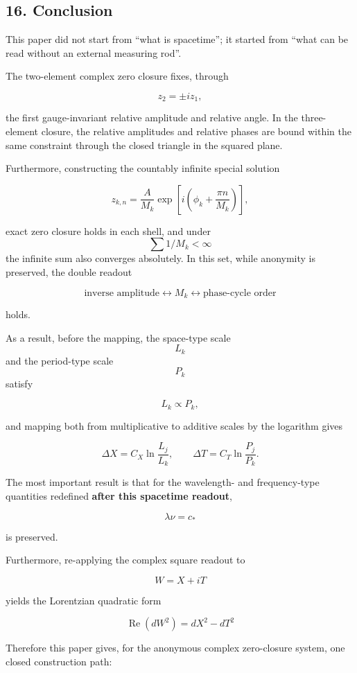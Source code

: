 \documentclass[
  a4paper,
]{article}
\begin{document}
\subsection{16. Conclusion}\label{conclusion}

This paper did not start from ``what is spacetime''; it started from
``what can be read without an external measuring rod''.

The two-element complex zero closure fixes, through

\[
z_2=\pm iz_1,
\]

the first gauge-invariant relative amplitude and relative angle. In the
three-element closure, the relative amplitudes and relative phases are
bound within the same constraint through the closed triangle in the
squared plane.

Furthermore, constructing the countably infinite special solution

\[
z_{k,n}
=
\frac{A}{M_k}
\exp\left[i\left(\phi_k+\frac{\pi n}{M_k}\right)\right],
\]

exact zero closure holds in each shell, and under \[\sum1/M_k<\infty\]
the infinite sum also converges absolutely. In this set, while anonymity
is preserved, the double readout

\[
\text{inverse amplitude}
\longleftrightarrow M_k
\longleftrightarrow
\text{phase-cycle order}
\]

holds.

As a result, before the mapping, the space-type scale \[L_k\] and the
period-type scale \[P_k\] satisfy

\[
L_k\propto P_k,
\]

and mapping both from multiplicative to additive scales by the logarithm
gives

\[
\Delta X
=C_X\ln\frac{L_j}{L_k},
\qquad
\Delta T
=C_T\ln\frac{P_j}{P_k}.
\]

The most important result is that for the wavelength- and frequency-type
quantities redefined \textbf{after this spacetime readout},

\[
\boxed{
\lambda\nu=c_*
}
\]

is preserved.

Furthermore, re-applying the complex square readout to

\[
W=X+iT
\]

yields the Lorentzian quadratic form

\[
\boxed{
\operatorname{Re}(dW^2)
=dX^2-dT^2
}
\]

Therefore this paper gives, for the anonymous complex zero-closure
system, one closed construction path:
\end{document}
